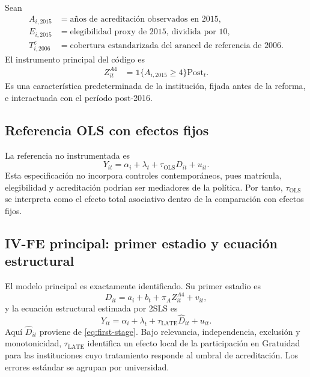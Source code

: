 \documentclass[11pt]{article}
\newcommand{\Post}{\mathrm{Post}}
\newcommand{\ind}{\mathbb{1}}
\begin{document}
Sean
\begin{align}
 A_{i,2015}&=\text{años de acreditación observados en 2015}, \\
 E_{i,2015}&=\text{elegibilidad proxy de 2015, dividida por 10}, \\
 T_{i,2006}^{z}&=\text{cobertura estandarizada del arancel de referencia de 2006}.
\end{align}
El instrumento principal del código es
\begin{align}
 Z^{A4}_{it}
 &=\ind\{A_{i,2015}\geq4\}\Post_t.
 \label{eq:iv-main-instrument}
\end{align}
Es una característica predeterminada de la institución, fijada antes de la
reforma, e interactuada con el período post-2016.

\subsection{Referencia OLS con efectos fijos}

La referencia no instrumentada es
\begin{equation}
 Y_{it}=\alpha_i+\lambda_t+\tau_{\mathrm{OLS}}D_{it}+u_{it}.
 \label{eq:iv-ols}
\end{equation}
Esta especificación no incorpora controles contemporáneos, pues matrícula,
elegibilidad y acreditación podrían ser mediadores de la política. Por tanto,
$\tau_{\mathrm{OLS}}$ se interpreta como el efecto total asociativo dentro de
la comparación con efectos fijos.

\subsection{IV-FE principal: primer estadio y ecuación estructural}

El modelo principal es exactamente identificado. Su primer estadio es
\begin{equation}
 D_{it}=a_i+b_t+\pi_A Z^{A4}_{it}+v_{it},
 \label{eq:first-stage}
\end{equation}
y la ecuación estructural estimada por 2SLS es
\begin{equation}
 Y_{it}=\alpha_i+\lambda_t+\tau_{\mathrm{LATE}}\widehat D_{it}+u_{it}.
 \label{eq:second-stage}
\end{equation}
Aquí $\widehat D_{it}$ proviene de \eqref{eq:first-stage}. Bajo relevancia,
independencia, exclusión y monotonicidad,
$\tau_{\mathrm{LATE}}$ identifica un efecto local de la participación en
Gratuidad para las instituciones cuyo tratamiento responde al umbral de
acreditación. Los errores estándar se agrupan por universidad.
\end{document}
